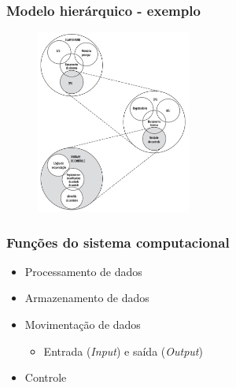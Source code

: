 \documentclass[aspectratio=169,
				xcolor=table]{beamer}
\begin{document}
	\begin{frame}
		\frametitle{Modelo hierárquico - exemplo}
		\begin{figure}
			\centering
			\includegraphics[height=6cm, keepaspectratio]{../figs/cap01/hierarquia2.png} 
		\end{figure}
	\end{frame}
	
	\begin{frame}
		\frametitle{Funções do sistema computacional}
		\begin{itemize}
			\item Processamento de dados

			\item Armazenamento de dados

			\item Movimentação de dados
			\begin{itemize}
				\item Entrada (\textit{Input}) e saída (\textit{Output})
			\end{itemize}

			\item Controle

		\end{itemize}
	\end{frame}	
\end{document}
